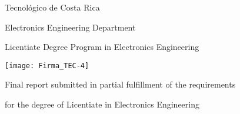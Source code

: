 {}

\thispagestyle{empty} 

\begin{center}

Tecnológico de Costa Rica

\par\vspace{1ex}

Electronics Engineering Department

\par\vspace{1ex}

Licentiate Degree Program in Electronics Engineering

\par\vspace{20mm}

\texttt{[image: Firma\_TEC-4]}

\par\vspace*{\fill}

{\large\bf{\thesisTitle\par}}

\par\vspace*{\fill}


Final report submitted in partial fulfillment of the requirements

for the degree of Licentiate in Electronics Engineering

\par\vspace{20mm}

\thesisAuthor

\vspace*{\fill}

\end{center}
\newpage 
\cleardoublepage 


